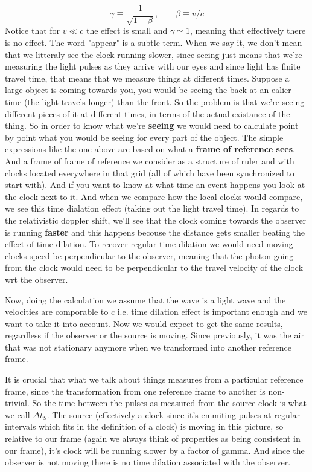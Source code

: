 \begin{equation*}
    \gamma \equiv \frac{1}{\sqrt{1 - \beta}}, \qquad \beta \equiv v/c
\end{equation*}
Notice that for $v \ll c$ the effect is small and $\gamma \simeq 1$, meaning that effectively there is no effect. The word "appear" is a subtle term. When we say it, we don't mean that we litteraly see the clock running slower, since seeing just means that we're measuring the light pulses as they arrive with our eyes and since light has finite travel time, that means that we measure things at different times. Suppose a large object is coming towards you, you would be seeing the back at an ealier time (the light travels longer) than the front. So the problem is that we're seeing different pieces of it at different times, in terms of the actual existance of the thing. So in order to know what we're \textbf{seeing} we would need to calculate point by point what you would be seeing for every part of the object. The simple expressions like the one above are based on what a \textbf{frame of reference sees}. And a frame of frame of reference we consider as a structure of ruler and with clocks located everywhere in that grid (all of which have been synchronized to start with). And if you want to know at what time an event happens you look at the clock next to it. And when we compare how the local clocks would compare, we see this time dialation effect (taking out the light travel time). In regards to the relativistic doppler shift, we'll see that the clock coming towards the observer is running \textbf{faster} and this happens becouse the distance gets smaller beating the effect of time dilation. To recover regular time dilation we would need moving clocks speed be perpendicular to the observer, meaning that the photon going from the clock would need to be perpendicular to the travel velocity of the clock wrt the observer.

Now, doing the calculation we assume that the wave is a light wave and the velocities are comporable to $c$ i.e. time dilation effect is important enough and we want to take it into account. Now we would expect to get the same results, regardless if the observer or the source is moving. Since previously, it was the air that was not stationary anymore when we transformed into another reference frame.

It is crucial that what we talk about things measures from a particular reference frame, since the transformation from one reference frame to another is non-trivial. So the time between the pulses as measured from the source clock is what we call $\Delta t_S$. The source (effectively a clock since it's emmiting pulses at regular intervals which fits in the definition of a clock) is moving in this picture, so relative to our frame (again we always think of properties as being consistent in our frame), it's clock will be running slower by a factor of gamma. And since the observer is not moving there is no time dilation associated with the observer.

